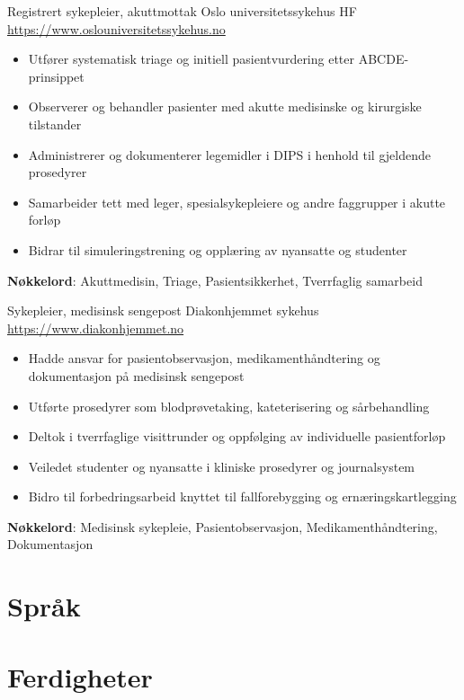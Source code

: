 \documentclass[a4paper, serif, 10pt]{moderncv}
\begin{document}
        {Registrert sykepleier, akuttmottak}
        {Oslo universitetssykehus HF}
        {\url{https://www.oslouniversitetssykehus.no}}
        {}
        {\begin{itemize}
\item Utfører systematisk triage og initiell pasientvurdering etter ABCDE-prinsippet
\item Observerer og behandler pasienter med akutte medisinske og kirurgiske tilstander
\item Administrerer og dokumenterer legemidler i DIPS i henhold til gjeldende prosedyrer
\item Samarbeider tett med leger, spesialsykepleiere og andre faggrupper i akutte forløp
\item Bidrar til simuleringstrening og opplæring av nyansatte og studenter
\end{itemize}
\textbf{Nøkkelord}: Akuttmedisin, Triage, Pasientsikkerhet, Tverrfaglig samarbeid}

        {Sykepleier, medisinsk sengepost}
        {Diakonhjemmet sykehus}
        {\url{https://www.diakonhjemmet.no}}
        {}
        {\begin{itemize}
\item Hadde ansvar for pasientobservasjon, medikamenthåndtering og dokumentasjon på medisinsk sengepost
\item Utførte prosedyrer som blodprøvetaking, kateterisering og sårbehandling
\item Deltok i tverrfaglige visittrunder og oppfølging av individuelle pasientforløp
\item Veiledet studenter og nyansatte i kliniske prosedyrer og journalsystem
\item Bidro til forbedringsarbeid knyttet til fallforebygging og ernæringskartlegging
\end{itemize}
\textbf{Nøkkelord}: Medisinsk sykepleie, Pasientobservasjon, Medikamenthåndtering, Dokumentasjon}
\section{Språk}

\section{Ferdigheter}
\end{document}
